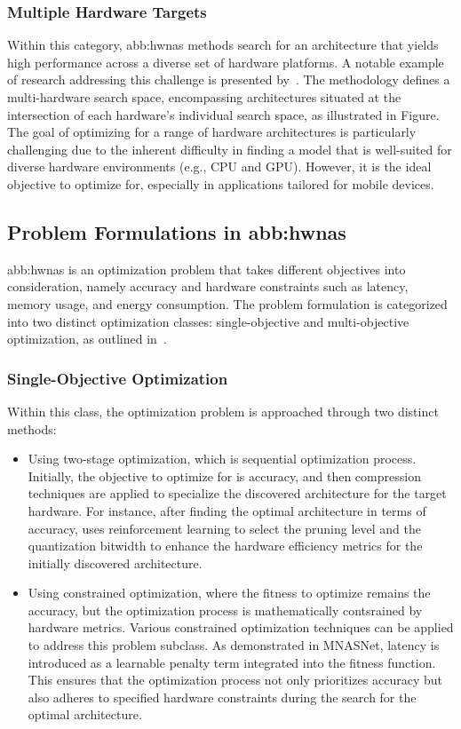         
        \subsubsection{Multiple Hardware Targets}
            Within this category, \gls{abb:hwnas} methods search for an architecture that yields high performance across a diverse set of hardware platforms. A notable example of research addressing this challenge is presented by~\cite{multi-target}. The methodology defines a multi-hardware search space, encompassing architectures situated at the intersection of each hardware's individual search space, as illustrated in Figure. The goal of optimizing for a range of hardware architectures is particularly challenging due to the inherent difficulty in finding a model that is well-suited for diverse hardware environments (e.g., CPU and GPU). However, it is the ideal objective to optimize for, especially in applications tailored for mobile devices.

    
    \subsection{Problem Formulations in \gls{abb:hwnas}}
        \gls{abb:hwnas} is an optimization problem that takes different objectives into consideration, namely accuracy and hardware constraints such as latency, memory usage, and energy consumption. The problem formulation is categorized into two distinct optimization classes: single-objective and multi-objective optimization, as outlined in~\cite{hwnas-survey}.
    
        \subsubsection{Single-Objective Optimization}
            Within this class, the optimization problem is approached through two distinct methods:
            \begin{itemize}
                \item Using two-stage optimization, which is sequential optimization process. Initially, the objective to optimize for is accuracy, and then compression techniques are applied to specialize the discovered architecture for the target hardware. For instance, after finding the optimal architecture in terms of accuracy, uses reinforcement learning to select the pruning level and the quantization bitwidth to enhance  the hardware efficiency metrics for the initially discovered architecture.
                \item Using constrained optimization, where the fitness to optimize remains the accuracy, but the optimization process is mathematically contsrained by hardware metrics. Various constrained optimization techniques can be applied to address this problem subclass. As demonstrated in MNASNet, latency is introduced as a learnable penalty term integrated into the fitness function. This ensures that the optimization process not only prioritizes accuracy but also adheres to specified hardware constraints during the search for the optimal architecture.
            \end{itemize}

